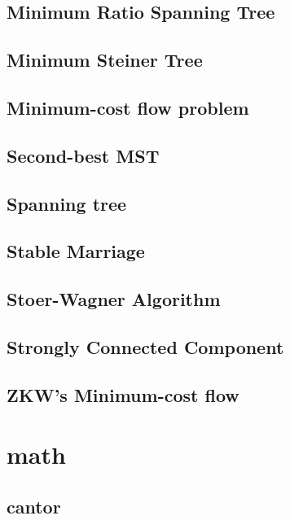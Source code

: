 \documentclass[a4paper,5pt,twocolumn,titlepage]{article}
\begin{document}
\subsection{Minimum Ratio Spanning Tree}

\subsection{Minimum Steiner Tree}

\subsection{Minimum-cost flow problem}

\subsection{Second-best MST}

\subsection{Spanning tree}

\subsection{Stable Marriage}

\subsection{Stoer-Wagner Algorithm}

\subsection{Strongly Connected Component}

\subsection{ZKW's Minimum-cost flow}


\section{math}
\subsection{cantor}

\end{document}
